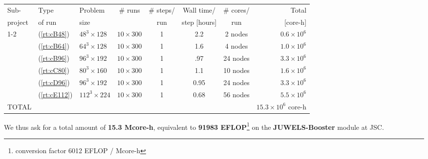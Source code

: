 \begin{center}
	{\small
		\begin{tabular}{lllccccr} \hline\hline
			Sub-         &
			Type         &
			Problem      &
			\# runs      &
			\# steps/    &
			Wall time/   &
			\# cores/    &
			Total                                                                                                               \\
			project      &
			of run       &
			size         &
			             &
			run          &
			step [hours] &
			run          &
			[core-h]                                                                                                            \\
			\hline\hline
			1-2          & (\ref{rt:cB48})  & $48^3\times 128$  & $10\times 300$ & 1 & 2.2  & 2 nodes  & $0.6 \times 10^6$      \\
			             & (\ref{rt:cB64})  & $64^3\times 128$  & $10\times 300$ & 1 & 1.6 & 4 nodes  & $1.0 \times 10^6$      \\
			             & (\ref{rt:cB96})  & $96^3\times 192$  & $10\times 300$ & 1 & .97 & 24 nodes & $3.3 \times 10^6$      \\
			             & (\ref{rt:cC80})  & $80^3\times 160$  & $10\times 300$ & 1 & 1.1 & 10 nodes & $1.6 \times 10^6$      \\
			             & (\ref{rt:cD96})  & $96^3\times 192$  & $10\times 300$ & 1 & 0.95 & 24 nodes & $3.3 \times 10^6$      \\
			             & (\ref{rt:cE112}) & $112^3\times 224$ & $10\times 300$ & 1 & 0.68 & 56 nodes & $5.5 \times 10^6$      \\
			\hline\hline
			TOTAL        &                  &                   &                &   &      &          & $15.3\times 10^6$ core-h \\
		\end{tabular}
	}
\end{center}
\bigskip
We thus ask for a total amount of \textbf{15.3 Mcore-h}, equivalent to \textbf{91983 EFLOP}\footnote{conversion factor 6012 EFLOP / Mcore-h}  on the \textbf{JUWELS-Booster} module at JSC.

